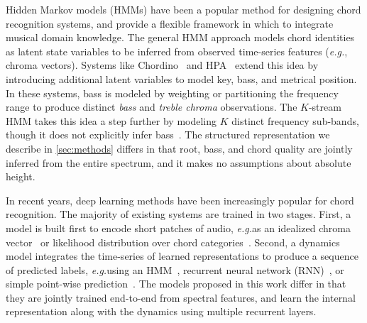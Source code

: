 \documentclass{article}
\def\eg{\emph{e.g.\/}}
\begin{document}
Hidden Markov models (HMMs) have been a popular method for designing chord recognition systems, and provide a flexible framework in which to integrate musical domain knowledge.
The general HMM approach models chord identities as latent state variables to be inferred from observed time-series features (\eg, chroma vectors).
Systems like Chordino~\cite{mauchsimple} and HPA~\cite{ni2012end} extend this idea by introducing additional latent variables to model key, bass, and metrical position.
In these systems, bass is modeled by weighting or partitioning the frequency range to produce distinct \emph{bass} and \emph{treble chroma} observations.
The $K$-stream HMM takes this idea a step further by modeling $K$ distinct frequency sub-bands, though it does not explicitly infer bass~\cite{cho2014improved}.
The structured representation we describe in \cref{sec:methods} differs in that root, bass, and chord quality are jointly inferred from the entire spectrum, and it makes no assumptions about absolute height.



%   

In recent years, deep learning methods have been increasingly popular for chord recognition.
The majority of existing systems are trained in two stages. 
First, a model is built first to encode short patches of audio, \eg as an idealized chroma vector~\cite{boulanger2013audio,korzeniowski2016feature} or likelihood distribution over chord categories~\cite{humphrey2015four,sigtia2015audio,zhou2015chord,deng2016hybrid}.
Second, a dynamics model integrates the time-series of learned representations to produce a sequence of predicted labels, \eg using an HMM~\cite{humphrey2015four,zhou2015chord}, recurrent neural network (RNN)~\cite{boulanger2013audio,sigtia2015audio}, or simple point-wise prediction~\cite{korzeniowski2016feature}.
The models proposed in this work differ in that they are jointly trained end-to-end from spectral features, and learn the internal representation along with the dynamics using multiple recurrent layers.
\end{document}
